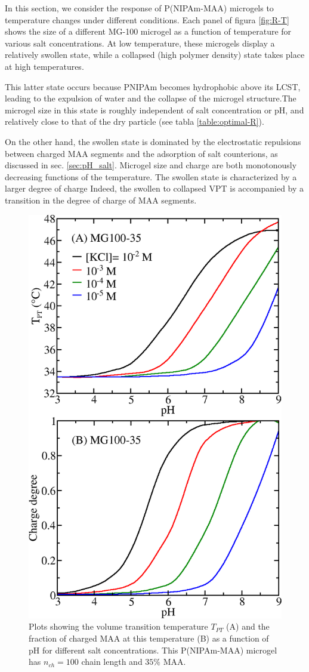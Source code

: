 In this section, we consider the response of P(NIPAm-MAA) microgels to temperature changes under different conditions.
Each panel of figura \ref{fig:R-T} shows the size of a different MG-100 microgel as a function of temperature for various salt concentrations.
At low temperature, these microgels display a relatively swollen state, while a collapsed (high polymer density) state takes place at high temperatures.



This latter state occurs because PNIPAm becomes hydrophobic above its LCST, leading to the expulsion of water and the collapse of the microgel structure.
The microgel size in this state is roughly independent of salt concentration or pH, and relatively close to that of the dry particle (see tabla \ref{table:optimal-R}).


On the other hand, the swollen state is dominated by the electrostatic repulsions between charged MAA segments and the adsorption of salt counterions, as discussed in sec. \ref{sec:pH_salt}.
Microgel size and charge are both monotonously decreasing functions of 
the temperature.
The swollen state is characterized by a larger degree of charge %
Indeed, the swollen to collapsed VPT is accompanied by a transition in the degree of charge of MAA segments.


\begin{figure}[!htb]
	\centering
	\includegraphics[width=0.5\linewidth]{Figures/graph-gel/Tpt-pH.png}
	\caption{Plots showing the volume transition temperature $T_{PT}$ (A) and the fraction of charged MAA at this temperature (B) as a function of pH for different salt concentrations.
		This P(NIPAm-MAA) microgel has $n_{ch}=100$ chain length and $35\%$ MAA.}
	\label{fig:Tpt-pH}
\end{figure}



